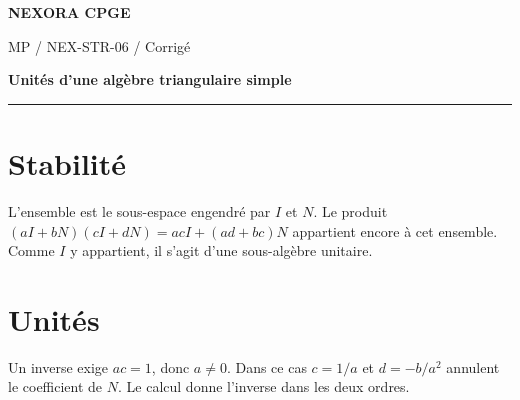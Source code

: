 \documentclass[11pt,a4paper]{article}
\begin{document}
{\small\bfseries\color{nexorablue} NEXORA CPGE}\par
{\small MP / NEX-STR-06 / Corrigé}\par
{\LARGE\bfseries Unités d’une algèbre triangulaire simple}\par
\vspace{0.25em}\hrule\vspace{0.6em}

\section*{Stabilité}
L’ensemble est le sous-espace engendré par $I$ et $N$. Le produit $(aI+bN)(cI+dN)=acI+(ad+bc)N$ appartient encore à cet ensemble. Comme $I$ y appartient, il s’agit d’une sous-algèbre unitaire.

\section*{Unités}
Un inverse exige $ac=1$, donc $a\ne0$. Dans ce cas $c=1/a$ et $d=-b/a^2$ annulent le coefficient de $N$. Le calcul donne l’inverse dans les deux ordres.
\end{document}
